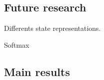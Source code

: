 \documentclass[a4paper,12pt]{article}
\begin{document}
      \subsection{Future research}
      
      Differents state representations.
      
      Softmax
      
      \subsection{Main results}
      
      
%        
\end{document}
